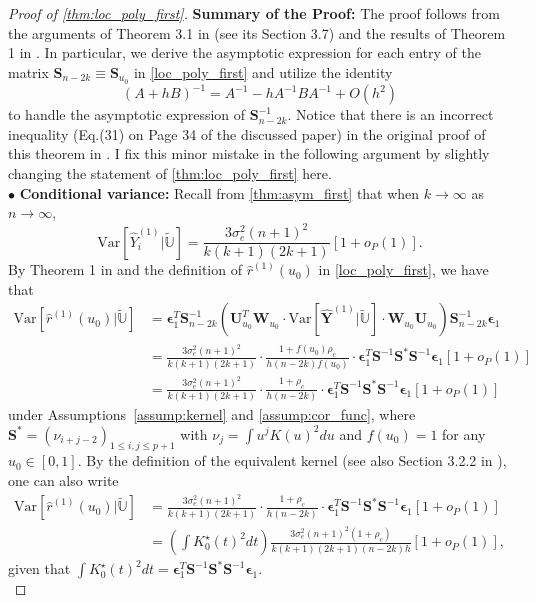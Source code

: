 \documentclass{uwstat572}
\theoremstyle{definition}
\renewcommand{\hat}{\widehat}
\renewcommand{\tilde}{\widetilde}
\theoremstyle{theorem}
\begin{document}
\begin{proof}[Proof of \autoref{thm:loc_poly_first}]
{\bf Summary of the Proof:} The proof follows from the arguments of Theorem 3.1 in \cite{fan1996local} (see its Section 3.7) and the results of Theorem 1 in \cite{de2018local}. In particular, we derive the asymptotic expression for each entry of the matrix $\bm{S}_{n-2k}\equiv \bm{S}_{u_0}$ in \eqref{loc_poly_first} and utilize the identity
$$(A+hB)^{-1} = A^{-1} - hA^{-1} B A^{-1} + O(h^2)$$
to handle the asymptotic expression of $\bm{S}_{n-2k}^{-1}$. Notice that there is an incorrect inequality (Eq.(31) on Page 34 of the discussed paper) in the original proof of this theorem in \cite{liu2020smoothed}. I fix this minor mistake in the following argument by slightly changing the statement of \autoref{thm:loc_poly_first} here.\\

$\bullet$ {\bf Conditional variance:} Recall from \autoref{thm:asym_first} that when $k\to \infty$ as $n\to\infty$, 
$$\mathrm{Var}\left[\hat{Y}_i^{(1)} \big| \tilde{\mathbb{U}}\right] = \frac{3\sigma_e^2 (n+1)^2}{k(k+1)(2k+1)}\left[1+ o_P(1)\right].$$
By Theorem 1 in \cite{de2018local} and the definition of $\hat{r}^{(1)}(u_0)$ in \eqref{loc_poly_first}, we have that
\begin{align*}
\mathrm{Var}\left[\hat{r}^{(1)}(u_0) \big| \tilde{\mathbb{U}}\right] &= \bm{\epsilon}_1^T \bm{S}_{n-2k}^{-1} \left(\bm{U}_{u_0}^T \bm{W}_{u_0} \cdot \mathrm{Var}\left[\hat{\bm{Y}}^{(1)} \big| \tilde{\mathbb{U}}\right] \cdot \bm{W}_{u_0} \bm{U}_{u_0}\right) \bm{S}_{n-2k}^{-1} \bm{\epsilon}_1\\
&= \frac{3\sigma_e^2 (n+1)^2}{k(k+1)(2k+1)} \cdot \frac{1 + f(u_0)\rho_c}{h(n-2k) f(u_0)}\cdot \bm{\epsilon}_1^T \bm{S}^{-1} \bm{S}^* \bm{S}^{-1} \bm{\epsilon}_1\left[1+ o_P(1)\right]\\
&= \frac{3\sigma_e^2 (n+1)^2}{k(k+1)(2k+1)} \cdot \frac{1 + \rho_c}{h(n-2k)}\cdot \bm{\epsilon}_1^T \bm{S}^{-1} \bm{S}^* \bm{S}^{-1} \bm{\epsilon}_1\left[1+ o_P(1)\right]
\end{align*}
under Assumptions~\ref{assump:kernel} and \ref{assump:cor_func}, where  $\bm{S}^*=\left(\nu_{i+j-2}\right)_{1\leq i,j\leq p+1}$ with $\nu_j = \int u^j K(u)^2 du$ and $f(u_0)=1$ for any $u_0\in [0,1]$. By the definition of the equivalent kernel (see also Section 3.2.2 in \citealt{fan1996local}), one can also write
\begin{align*}
\mathrm{Var}\left[\hat{r}^{(1)}(u_0) \big| \tilde{\mathbb{U}}\right] &= \frac{3\sigma_e^2 (n+1)^2}{k(k+1)(2k+1)} \cdot \frac{1 + \rho_c}{h(n-2k)}\cdot \bm{\epsilon}_1^T \bm{S}^{-1} \bm{S}^* \bm{S}^{-1} \bm{\epsilon}_1\left[1+ o_P(1)\right] \\
&= \left(\int K_0^{\star}(t)^2 dt \right) \frac{3\sigma_e^2 (n+1)^2 (1+\rho_c)}{k(k+1)(2k+1) (n-2k) h} \left[1+o_P(1)\right],
\end{align*}
given that $\int K_0^{\star}(t)^2 dt = \bm{\epsilon}_1^T \bm{S}^{-1}\bm{S}^* \bm{S}^{-1} \bm{\epsilon}_1$.\\


\end{proof}
\end{document}
